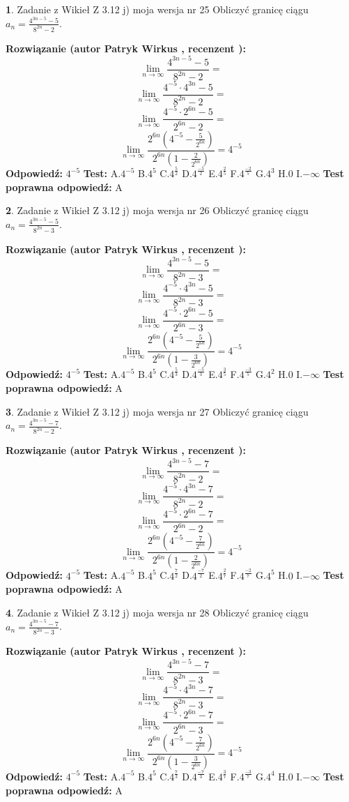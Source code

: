 \documentclass[12pt, a4paper]{article}
\theoremstyle{definition} %
\newtheorem{zad}{}
\newcommand{\zadStart}[1]{\begin{zad}#1\newline}
\newcommand{\zadStop}{\end{zad}}
\newcommand{\rozwStart}[2]{\noindent \textbf{Rozwiązanie (autor #1 , recenzent #2): }\newline}
\newcommand{\rozwStop}{\newline}
\newcommand{\odpStart}{\noindent \textbf{Odpowiedź:}\newline}
\newcommand{\odpStop}{\newline}
\newcommand{\testStart}{\noindent \textbf{Test:}\newline}
\newcommand{\testStop}{\newline}
\newcommand{\kluczStart}{\noindent \textbf{Test poprawna odpowiedź:}\newline}
\newcommand{\kluczStop}{\newline}
\begin{document}
\zadStart{Zadanie z Wikieł Z 3.12 j) moja wersja nr 25}
Obliczyć granicę ciągu $a_{n}=\frac{4^{3n-5}-5}{8^{2n}-2}$.
\zadStop
\rozwStart{Patryk Wirkus}{}
$$\lim\limits_{n\to\infty}\frac{4^{3n-5}-5}{8^{2n}-2}=$$
$$\lim\limits_{n\to\infty}\frac{4^{-5} \cdot 4^{3n}-5}{8^{2n}-2}=$$
$$\lim\limits_{n\to\infty}\frac{4^{-5} \cdot 2^{6n}-5}{2^{6n}-2}=$$
$$\lim\limits_{n\to\infty}\frac{2^{6n}(4^{-5} - \frac{5}{2^{6n}})}{2^{6n}(1-\frac{2}{2^{6n}})}= 4^{-5}$$
\rozwStop
\odpStart
$4^{-5}$
\odpStop
\testStart
A.$4^{-5}$
B.$4^{5}$
C.$4^{\frac{5}{2}}$
D.$4^{\frac{-5}{2}}$
E.$4^{\frac{2}{5}}$
F.$4^{\frac{-2}{5}}$
G.$4^{3}$
H.$0$
I.$-\infty$
\testStop
\kluczStart
A
\kluczStop



\zadStart{Zadanie z Wikieł Z 3.12 j) moja wersja nr 26}
Obliczyć granicę ciągu $a_{n}=\frac{4^{3n-5}-5}{8^{2n}-3}$.
\zadStop
\rozwStart{Patryk Wirkus}{}
$$\lim\limits_{n\to\infty}\frac{4^{3n-5}-5}{8^{2n}-3}=$$
$$\lim\limits_{n\to\infty}\frac{4^{-5} \cdot 4^{3n}-5}{8^{2n}-3}=$$
$$\lim\limits_{n\to\infty}\frac{4^{-5} \cdot 2^{6n}-5}{2^{6n}-3}=$$
$$\lim\limits_{n\to\infty}\frac{2^{6n}(4^{-5} - \frac{5}{2^{6n}})}{2^{6n}(1-\frac{3}{2^{6n}})}= 4^{-5}$$
\rozwStop
\odpStart
$4^{-5}$
\odpStop
\testStart
A.$4^{-5}$
B.$4^{5}$
C.$4^{\frac{5}{3}}$
D.$4^{\frac{-5}{3}}$
E.$4^{\frac{3}{5}}$
F.$4^{\frac{-3}{5}}$
G.$4^{2}$
H.$0$
I.$-\infty$
\testStop
\kluczStart
A
\kluczStop



\zadStart{Zadanie z Wikieł Z 3.12 j) moja wersja nr 27}
Obliczyć granicę ciągu $a_{n}=\frac{4^{3n-5}-7}{8^{2n}-2}$.
\zadStop
\rozwStart{Patryk Wirkus}{}
$$\lim\limits_{n\to\infty}\frac{4^{3n-5}-7}{8^{2n}-2}=$$
$$\lim\limits_{n\to\infty}\frac{4^{-5} \cdot 4^{3n}-7}{8^{2n}-2}=$$
$$\lim\limits_{n\to\infty}\frac{4^{-5} \cdot 2^{6n}-7}{2^{6n}-2}=$$
$$\lim\limits_{n\to\infty}\frac{2^{6n}(4^{-5} - \frac{7}{2^{6n}})}{2^{6n}(1-\frac{2}{2^{6n}})}= 4^{-5}$$
\rozwStop
\odpStart
$4^{-5}$
\odpStop
\testStart
A.$4^{-5}$
B.$4^{5}$
C.$4^{\frac{7}{2}}$
D.$4^{\frac{-7}{2}}$
E.$4^{\frac{2}{7}}$
F.$4^{\frac{-2}{7}}$
G.$4^{5}$
H.$0$
I.$-\infty$
\testStop
\kluczStart
A
\kluczStop



\zadStart{Zadanie z Wikieł Z 3.12 j) moja wersja nr 28}
Obliczyć granicę ciągu $a_{n}=\frac{4^{3n-5}-7}{8^{2n}-3}$.
\zadStop
\rozwStart{Patryk Wirkus}{}
$$\lim\limits_{n\to\infty}\frac{4^{3n-5}-7}{8^{2n}-3}=$$
$$\lim\limits_{n\to\infty}\frac{4^{-5} \cdot 4^{3n}-7}{8^{2n}-3}=$$
$$\lim\limits_{n\to\infty}\frac{4^{-5} \cdot 2^{6n}-7}{2^{6n}-3}=$$
$$\lim\limits_{n\to\infty}\frac{2^{6n}(4^{-5} - \frac{7}{2^{6n}})}{2^{6n}(1-\frac{3}{2^{6n}})}= 4^{-5}$$
\rozwStop
\odpStart
$4^{-5}$
\odpStop
\testStart
A.$4^{-5}$
B.$4^{5}$
C.$4^{\frac{7}{3}}$
D.$4^{\frac{-7}{3}}$
E.$4^{\frac{3}{7}}$
F.$4^{\frac{-3}{7}}$
G.$4^{4}$
H.$0$
I.$-\infty$
\testStop
\kluczStart
A
\kluczStop
\end{document}
